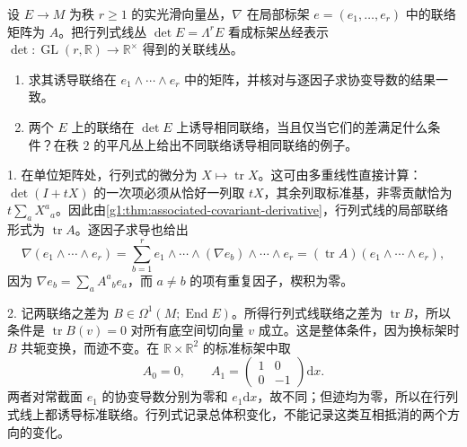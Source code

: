 \begin{exercise}\label{g1:ex:principal-determinant-connection}
	设 \(E\to M\) 为秩 \(r\geq1\) 的实光滑向量丛，\(\nabla\) 在局部标架 \(e=(e_1,\ldots,e_r)\) 中的联络矩阵为 \(A\)。把行列式线丛 \(\det E=\Lambda^rE\) 看成标架丛经表示 \(\det:\operatorname{GL}(r,\mathbb R)\to\mathbb R^\times\) 得到的关联线丛。
	\begin{enumerate}
		\item 求其诱导联络在 \(e_1\wedge\cdots\wedge e_r\) 中的矩阵，并核对与逐因子求协变导数的结果一致。
		\item 两个 \(E\) 上的联络在 \(\det E\) 上诱导相同联络，当且仅当它们的差满足什么条件？在秩 \(2\) 的平凡丛上给出不同联络诱导相同联络的例子。
	\end{enumerate}
\end{exercise}
\begin{solution}
	1. 在单位矩阵处，行列式的微分为 \(X\mapsto\operatorname{tr}X\)。这可由多重线性直接计算：\(\det(I+tX)\) 的一次项必须从恰好一列取 \(tX\)，其余列取标准基，非零贡献恰为 \(t\sum_aX^a{}_a\)。因此由\cref{g1:thm:associated-covariant-derivative}，行列式线的局部联络形式为 \(\operatorname{tr}A\)。逐因子求导也给出
	\[
		\nabla(e_1\wedge\cdots\wedge e_r)
		=\sum_{b=1}^r e_1\wedge\cdots\wedge(\nabla e_b)\wedge\cdots\wedge e_r
		=(\operatorname{tr}A)(e_1\wedge\cdots\wedge e_r),
	\]
	因为 \(\nabla e_b=\sum_a A^a{}_b e_a\)，而 \(a\ne b\) 的项有重复因子，楔积为零。

	2. 记两联络之差为 \(B\in\Omega^1(M;\operatorname{End}E)\)。所得行列式线联络之差为 \(\operatorname{tr}B\)，所以条件是 \(\operatorname{tr}B(v)=0\) 对所有底空间切向量 \(v\) 成立。这是整体条件，因为换标架时 \(B\) 共轭变换，而迹不变。在 \(\mathbb R\times\mathbb R^2\) 的标准标架中取
	\[
		A_0=0,\qquad A_1=\begin{pmatrix}1&0\\0&-1\end{pmatrix}\mathrm{d}x.
	\]
	两者对常截面 \(e_1\) 的协变导数分别为零和 \(e_1\mathrm{d}x\)，故不同；但迹均为零，所以在行列式线上都诱导标准联络。行列式记录总体积变化，不能记录这类互相抵消的两个方向的变化。
\end{solution}

